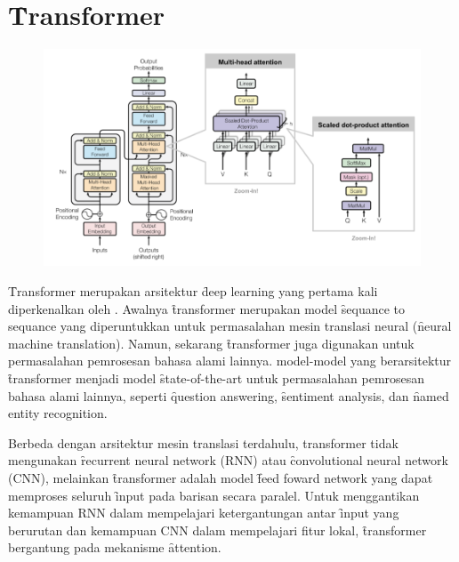 \section{\f{Transformer}}
	\begin{figure}
		\centering
		\includegraphics[width=1\textwidth]{assets/pics/lilianweng-transformer.png}
		\label{fig:transformer}
	\end{figure}
	\f{Transformer} merupakan arsitektur \f{deep learning} yang pertama kali diperkenalkan oleh \cite{transformerori}. Awalnya \f{transformer}  merupakan model \f{sequance to sequance} yang diperuntukkan untuk permasalahan mesin translasi neural (\f{neural machine translation}). Namun, sekarang \f{transformer} juga digunakan untuk permasalahan pemrosesan bahasa alami lainnya. model-model yang berarsitektur \f{transformer} menjadi model \f{state-of-the-art} untuk permasalahan pemrosesan bahasa alami lainnya, seperti \f{question answering}, \f{sentiment analysis}, dan \f{named entity recognition}.
 
	Berbeda dengan arsitektur mesin translasi terdahulu, transformer tidak mengunakan \f{recurrent neural network} (RNN) atau \f{convolutional neural network} (CNN), melainkan \f{transformer} adalah model \f{feed foward network} yang dapat memproses seluruh \f{input} pada barisan secara paralel. Untuk menggantikan kemampuan RNN dalam mempelajari ketergantungan antar \f{input} yang berurutan dan kemampuan CNN dalam mempelajari fitur lokal, \f{transformer} bergantung pada mekanisme \f{attention}.

